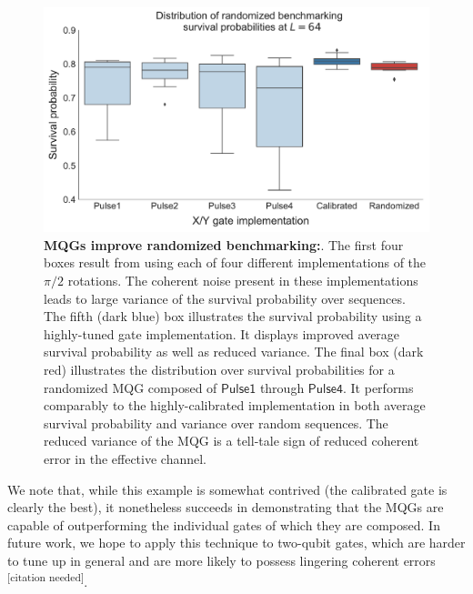 \documentclass[aps,nofootinbib,pra,notitlepage,twocolumn]{revtex4-1}
\newcommand{\needcite}{{\color{blue}\textsuperscript{[citation needed]}}}
\newcommand{\0}{\ensuremath{\mathbf{0}}}
\begin{document}
{\begin{figure}[t]
  \centering
  \includegraphics[width=\columnwidth]{rb_data.pdf}
  \caption{\textbf{MQGs improve randomized benchmarking:}. The first four boxes result from using each of four different implementations of the ${\pi/2}$ rotations. The coherent noise present in these implementations leads to large variance of the survival probability over sequences. The fifth (dark blue) box illustrates the survival probability using a highly-tuned gate implementation. It displays improved average survival probability as well as reduced variance. The final box (dark red) illustrates the distribution over survival probabilities for a randomized MQG composed of $\mathsf{Pulse1}$ through $\mathsf{Pulse4}$. It performs comparably to the highly-calibrated implementation in both average survival probability and variance over random sequences. The reduced variance of the MQG is a tell-tale sign of reduced coherent error in the effective channel. }
  \label{fig:rb}
\end{figure}

We note that, while this example is somewhat contrived (the calibrated gate is clearly the best), it nonetheless succeeds in demonstrating that the MQGs are capable of outperforming the individual gates of which they are composed. In future work, we hope to apply this technique to two-qubit gates, which are harder to tune up in general and are more likely to possess lingering coherent errors \needcite. 



}
\end{document}
